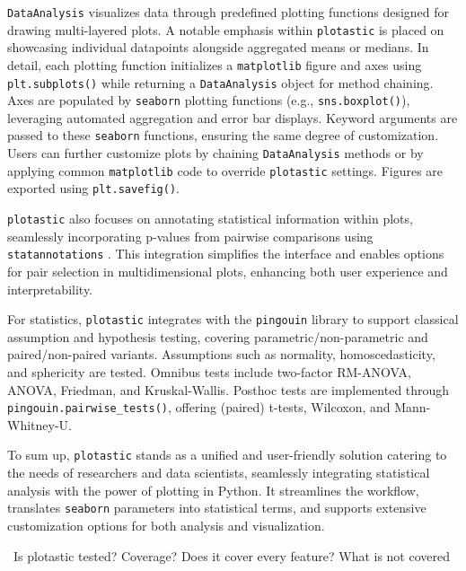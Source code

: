 \texttt{DataAnalysis} visualizes data through predefined plotting functions
designed for drawing multi-layered plots. A notable emphasis within
\texttt{plotastic} is placed on showcasing individual datapoints alongside
aggregated means or medians. In detail, each plotting function
initializes a \texttt{matplotlib} figure and axes using \texttt{plt.subplots()} while
returning a \texttt{DataAnalysis} object for method chaining. Axes are
populated by \texttt{seaborn} plotting functions (e.g., \texttt{sns.boxplot()}),
leveraging automated aggregation and error bar displays. Keyword
arguments are passed to these \texttt{seaborn} functions, ensuring the same
degree of customization. Users can further customize plots
by chaining \texttt{DataAnalysis} methods or by applying common \texttt{matplotlib} code
to override \texttt{plotastic} settings. Figures are exported using
\texttt{plt.savefig()}.

\texttt{plotastic} also focuses on annotating statistical information within
plots, seamlessly incorporating p-values from pairwise comparisons using
\texttt{statannotations} \cite{charlierTrevismdStatannotationsV02022}. This
integration simplifies the interface and enables options for pair
selection in multidimensional plots, enhancing both user experience and
interpretability.

For statistics, \texttt{plotastic} integrates with the \texttt{pingouin} library
to support classical assumption and hypothesis testing, covering
parametric/non-parametric and paired/non-paired variants. Assumptions such as
normality, homoscedasticity, and sphericity are tested. Omnibus tests include
two-factor RM-ANOVA, ANOVA, Friedman, and Kruskal-Wallis. Posthoc tests are
implemented through \texttt{pingouin.pairwise\_tests()}, offering (paired)
t-tests, Wilcoxon, and Mann-Whitney-U.

To sum up, \texttt{plotastic} stands as a unified and user-friendly solution
catering to the needs of researchers and data scientists, seamlessly
integrating statistical analysis with the power of plotting in Python.
It streamlines the workflow, translates \texttt{seaborn} parameters into
statistical terms, and supports extensive customization options for both
analysis and visualization.








\
Is plotastic tested? Coverage? Does it cover every feature? What is not covered

